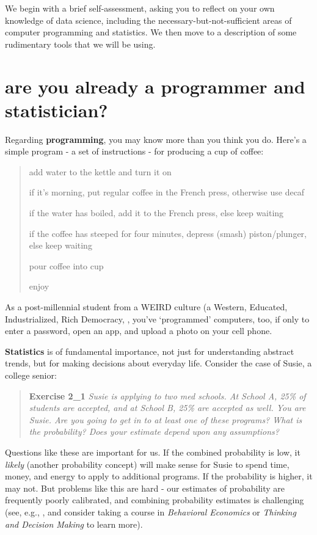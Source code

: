 \documentclass[
  openany]{book}
\begin{document}
We begin with a brief self-assessment, asking you to reflect on your own knowledge of data science, including the necessary-but-not-sufficient areas of computer programming and statistics. We then move to a description of some rudimentary tools that we will be using.

\hypertarget{are-you-already-a-programmer-and-statistician}{%
\section{are you already a programmer and statistician?}\label{are-you-already-a-programmer-and-statistician}}

Regarding \textbf{programming}, you may know more than you think you do. Here's a simple program - a set of instructions - for producing a cup of coffee:

\begin{quote}
add water to the kettle and turn it on

if it's morning, put regular coffee in the French press, otherwise use decaf

if the water has boiled, add it to the French press, else keep waiting

if the coffee has steeped for four minutes, depress (smash) piston/plunger, else keep waiting

pour coffee into cup

enjoy
\end{quote}

As a post-millennial student from a WEIRD culture (a Western, Educated, Industrialized, Rich Democracy, \citet{henrich2010weirdest}, you've `programmed' computers, too, if only to enter a password, open an app, and upload a photo on your cell phone.

\textbf{Statistics} is of fundamental importance, not just for understanding abstract trends, but for making decisions about everyday life. Consider the case of Susie, a college senior:

\begin{quote}
\textbf{Exercise 2\_1}
\emph{Susie is applying to two med schools. At School A, 25\% of students are accepted, and at School B, 25\% are accepted as well. You are Susie. Are you going to get in to at least one of these programs? What is the probability? Does your estimate depend upon any assumptions?}
\end{quote}

Questions like these are important for us. If the combined probability is low, it \emph{likely} (another probability concept) will make sense for Susie to spend time, money, and energy to apply to additional programs. If the probability is higher, it may not. But problems like this are hard - our estimates of probability are frequently poorly calibrated, and combining probability estimates is challenging (see, e.g., \citet{tversky1974judgment}, and consider taking a course in \emph{Behavioral Economics} or \emph{Thinking and Decision Making} to learn more).
\end{document}
